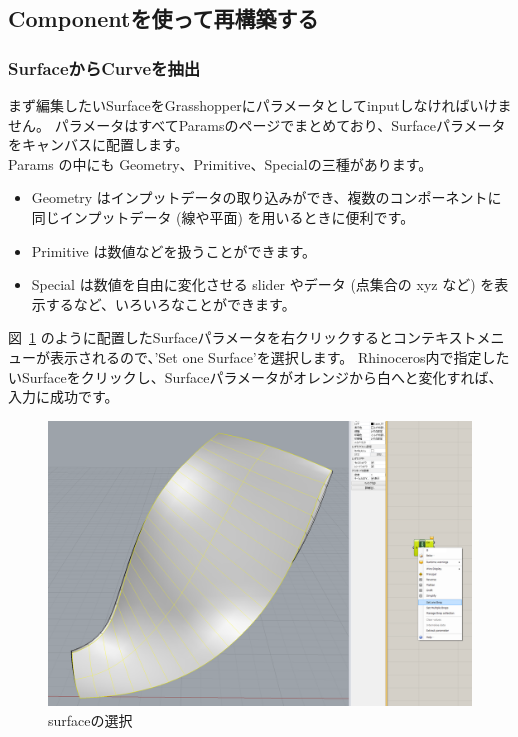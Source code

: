 \documentclass[11pt]{jarticle}
\begin{document}
\subsection{Componentを使って再構築する}
\subsubsection{SurfaceからCurveを抽出}
\label{sec:s1}
まず編集したいSurfaceをGrasshopperにパラメータとしてinputしなければいけません。
パラメータはすべてParamsのページでまとめており、Surfaceパラメータをキャンバスに配置します。\\
Params の中にも Geometry、Primitive、Specialの三種があります。\\
\begin{itemize}
\item
Geometry はインプットデータの取り込みができ、複数のコンポーネントに同じインプットデータ (線や平面) を用いるときに便利です。
\item
Primitive は数値などを扱うことができます。
\item
Special は数値を自由に変化させる slider やデータ (点集合の xyz など) を表示するなど、いろいろなことができます。
\end{itemize}
図~\ref{fig:setgeo} のように配置したSurfaceパラメータを右クリックするとコンテキストメニューが表示されるので、'Set one Surface'を選択します。
Rhinoceros内で指定したいSurfaceをクリックし、Surfaceパラメータがオレンジから白へと変化すれば、入力に成功です。

\begin{figure}[H]
  \centering
    \includegraphics[width=\linewidth]{fig/setbrep.png}
    \caption{surfaceの選択}
    \label{fig:setgeo}
\end{figure}
\end{document}
